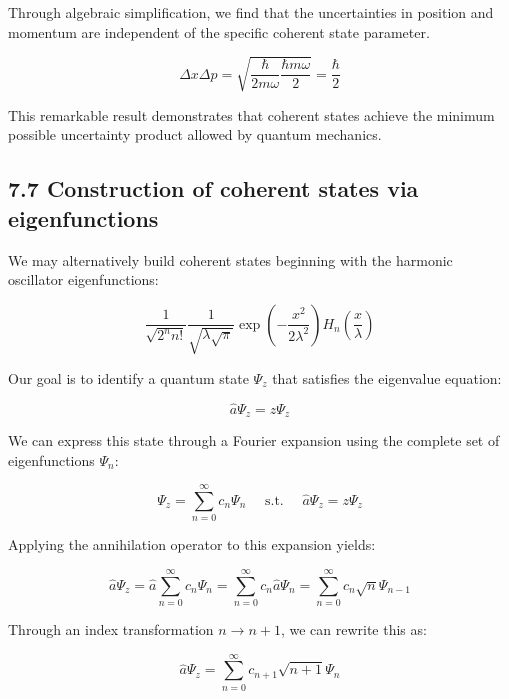 \documentclass[10pt]{article}
\begin{document}
Through algebraic simplification, we find that the uncertainties in position and momentum are independent of the specific coherent state parameter.

\begin{equation*}
\Delta x \Delta p=\sqrt{\frac{\hbar}{2 m \omega} \frac{\hbar m \omega}{2}}=\frac{\hbar}{2} \tag{7.75}
\end{equation*}

This remarkable result demonstrates that coherent states achieve the minimum possible uncertainty product allowed by quantum mechanics.

\subsection*{7.7 Construction of coherent states via eigenfunctions}
We may alternatively build coherent states beginning with the harmonic oscillator eigenfunctions:

\begin{equation*}
\frac{1}{\sqrt{2^{n} n!}} \frac{1}{\sqrt{\lambda \sqrt{\pi}}} \exp \left(-\frac{x^{2}}{2 \lambda^{2}}\right) H_{n}\left(\frac{x}{\lambda}\right) \tag{7.76}
\end{equation*}

Our goal is to identify a quantum state $\Psi_{z}$ that satisfies the eigenvalue equation:

\begin{equation*}
\hat{a} \Psi_{z}=z \Psi_{z} \tag{7.77}
\end{equation*}

We can express this state through a Fourier expansion using the complete set of eigenfunctions $\Psi_{n}$:

\begin{equation*}
\Psi_{z}=\sum_{n=0}^{\infty} c_{n} \Psi_{n} \quad \text { s.t. } \quad \hat{a} \Psi_{z}=z \Psi_{z} \tag{7.78}
\end{equation*}

Applying the annihilation operator to this expansion yields:

\begin{equation*}
\hat{a} \Psi_{z}=\hat{a} \sum_{n=0}^{\infty} c_{n} \Psi_{n}=\sum_{n=0}^{\infty} c_{n} \hat{a} \Psi_{n}=\sum_{n=0}^{\infty} c_{n} \sqrt{n} \Psi_{n-1} \tag{7.79}
\end{equation*}

Through an index transformation $n \rightarrow n+1$, we can rewrite this as:

\begin{equation*}
\hat{a} \Psi_{z}=\sum_{n=0}^{\infty} c_{n+1} \sqrt{n+1} \Psi_{n} \tag{7.80}
\end{equation*}
\end{document}
